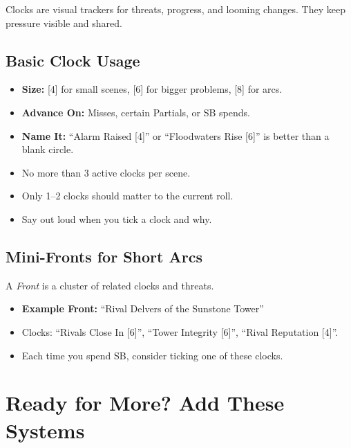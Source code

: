 Clocks are visual trackers for threats, progress, and looming changes. They keep pressure visible and shared.

\subsection{Basic Clock Usage}
\label{subsec:clock-usage}
\begin{itemize}
\item \textbf{Size:} [4] for small scenes, [6] for bigger problems, [8] for arcs.
\item \textbf{Advance On:} Misses, certain Partials, or SB spends.
\item \textbf{Name It:} “Alarm Raised [4]” or “Floodwaters Rise [6]” is better than a blank circle.
\end{itemize}

\begin{tcolorbox}[title=Beginner Clock Limits, colback=white!97!gray, colframe=black!80!gray]
\begin{itemize}
\item No more than 3 active clocks per scene.
\item Only 1–2 clocks should matter to the current roll.
\item Say out loud when you tick a clock and why.
\end{itemize}
\end{tcolorbox}

\subsection{Mini-Fronts for Short Arcs}
\label{subsec:mini-fronts}
A \emph{Front} is a cluster of related clocks and threats.
\begin{itemize}
\item \textbf{Example Front:} “Rival Delvers of the Sunstone Tower”
\item Clocks: “Rivals Close In [6]”, “Tower Integrity [6]”, “Rival Reputation [4]”.
\item Each time you spend SB, consider ticking one of these clocks.
\end{itemize}

\section{Ready for More? Add These Systems}
\label{sec:modular-systems}


